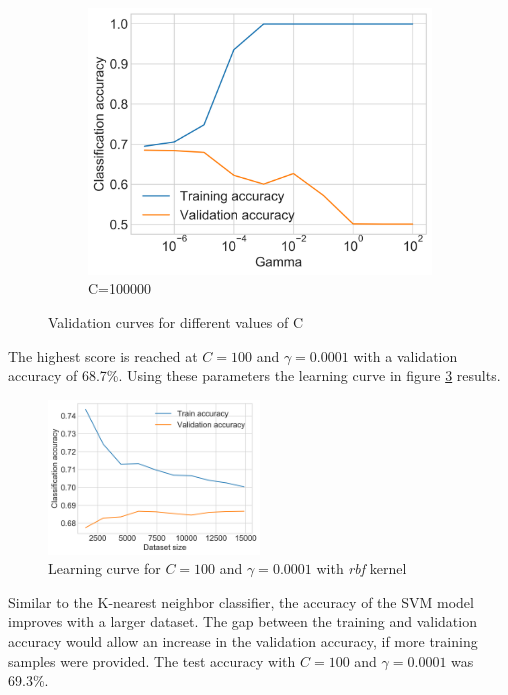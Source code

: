 \begin{figure}[h]
\begin{subfigure}{0.5\textwidth}
    \end{subfigure}
    \begin{subfigure}{0.5\textwidth}
        \centering
        \includegraphics[width=\textwidth]{figures/charts/svm_validation_C_100000.png}
        \caption{C=100000}
        \label{figure:svm_validation_C_100000}
    \end{subfigure}
    \caption{Validation curves for different values of C}
    \label{figure:svm_validation}
\end{figure}
The highest score is reached at $C=100$ and $\gamma=0.0001$ with a validation accuracy of 68.7\%.
Using these parameters the learning curve in figure \ref{figure:svm_learning} results.
\begin{figure}[h]
    \centering
    \includegraphics[width=0.5\textwidth]{figures/charts/svm_learning_curve.png}
    \caption{Learning curve for $C=100$ and $\gamma=0.0001$ with \textit{rbf} kernel}
    \label{figure:svm_learning}
\end{figure}
Similar to the K-nearest neighbor classifier, the accuracy of the \ac{SVM} model improves with a larger dataset.
The gap between the training and validation accuracy would allow an increase in the validation accuracy, if more training samples were provided.
The test accuracy with $C=100$ and $\gamma=0.0001$ was 69.3\%.


